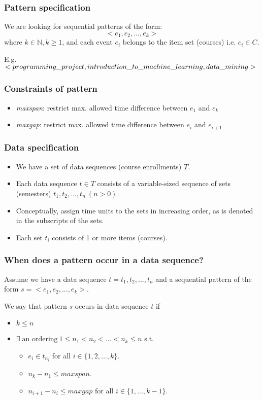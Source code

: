 \documentclass{beamer}
\begin{document}
\begin{frame}
  \frametitle{Pattern specification}
  We are looking for sequential patterns of the form:
  $$
    <e_1, e_2, ..., e_k>
  $$
  where $k \in \mathbb{N}, k \geq 1$, and each event $e_i$ belongs to the item
  set (courses) i.e. $e_i \in C$.

  \quad

  E.g.
  $
  <programming\_project, introduction\_to\_machine\_learning, \linebreak data\_mining>
  $

\end{frame}

\begin{frame}
  \frametitle{Constraints of pattern}
  \begin{itemize}
    \item{\emph{maxspan}: restrict max. allowed time difference between $e_1$
    and $e_k$}
    \item{\emph{maxgap}: restrict max. allowed time difference between $e_i$
    and $e_{i+1}$}
  \end{itemize}
\end{frame}

\begin{frame}
  \frametitle{Data specification}
  \begin{itemize}
    \item{We have a set of data sequences (course enrollments) $T$.}
    \item{Each data sequence $t \in T$ consists of a variable-sized sequence of
    sets (semesters)  $t_1, t_2, ..., t_n \: (n > 0)$.}
    \item{Conceptually, assign time units to the sets in increasing order,
    as is denoted in the subscripts of the sets.}
    \item{Each set $t_i$ consists of 1 or more items (courses).}
  \end{itemize}
\end{frame}

\begin{frame}
  \frametitle{When does a pattern occur in a data sequence?}
  Assume we have a data sequence $t = t_1, t_2, ..., t_n$ and a sequential
  pattern of the form $s = <e_1, e_2, ..., e_k>$.

  \quad

  We say that pattern $s$ occurs in data sequence $t$ if
  \begin{itemize}
    \item{$k \leq n$}
    \item{$\exists \; \text{an ordering} \: 1 \leq n_1 < n_2 < ... <
    n_k \leq n$ s.t.
    \begin{itemize}
      \item{$e_i \in t_{n_i}$ for all $i \in \{1,2,...,k\}$.}
      \item{$n_k - n_1 \leq maxspan$.}
      \item{$n_{i+1} - n_i \leq maxgap$ for all $i \in \{1, ..., k-1\}$.}
    \end{itemize}
    }
  \end{itemize}
\end{frame}
\end{document}
